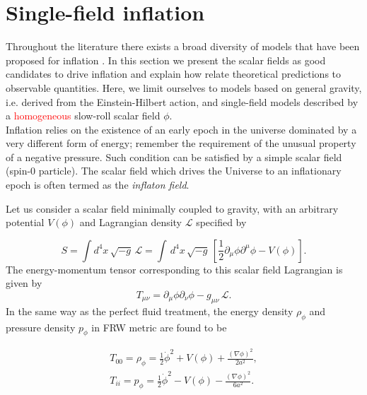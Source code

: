 \documentclass{rmaa}
\def\beq{\begin{equation}}
\def\eeq{\end{equation}}
\begin{document}




\section{Single-field inflation}
\vskip 6pt


Throughout the literature there exists a broad diversity of models that have been proposed for inflation 
\citep{LiddleLyth, Olive, Lyth}. In this section we present the scalar fields as good candidates 
to drive inflation and explain how relate theoretical predictions to observable quantities. 
Here, we limit ourselves to models based on general gravity, i.e. derived from the
Einstein-Hilbert action, and single-field models described by a \textcolor{red}{homogeneous} slow-roll scalar field $\phi$.
\\

Inflation relies on the existence of an early epoch in the universe dominated by a very 
different form of energy; remember the requirement of the unusual property of a negative 
pressure. Such condition can be satisfied by a simple scalar field (spin-0 particle). 
The scalar field which drives the Universe to an inflationary epoch is often termed 
as the \textit{inflaton field}. 
%

Let us consider a scalar field minimally coupled to gravity, with an arbitrary
potential $V(\phi)$ and Lagrangian density $\mathcal{L}$ specified by 


\begin{equation}
S=\int d^4x\, \sqrt{-g}\,\mathcal{L}=\int\, d^4x\, \sqrt{-g}\,
\left[\frac{1}{2}
\partial_{\mu}\phi
\partial^{\mu}\phi -V(\phi)\right].
\end{equation}
%
%
The energy-momentum tensor corresponding to this scalar field Lagrangian is given by
\beq
T_{\mu\nu}=\partial_{\mu}\phi \partial_{\nu}\phi
-g_{\mu\nu}\, \mathcal{L}.
\eeq
%
In the same way as the perfect fluid treatment, the 
energy density $\rho_\phi$ and pressure density $p_\phi$ in FRW metric are found to be 

\begin{eqnarray}
T_{00}=\rho_{\phi}=\frac{1}{2}\dot{\phi}^2 + V(\phi)+ 
\frac{(\nabla \phi)^2}{2a^2},  \\
T_{ii}=p_{\phi}=\frac{1}{2}\dot{\phi}^2 - V(\phi)- \frac{(\nabla
\phi)^2}{6a^2}.
\end{eqnarray}
\end{document}
